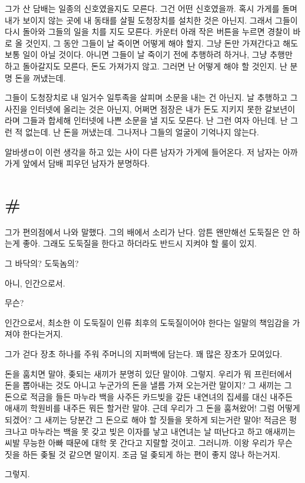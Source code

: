 \documentclass[a5paper,10pt, twoside, openright]{memoir}
\begin{document}
	그가 산 담배는 일종의 신호였을지도 모른다. 그건 어떤 신호였을까. 혹시 가게를 돌며 내가 보이지 않는 곳에 내 동태를 살필 도청장치를 설치한 것은 아닌지. 그래서 그들이 다시 돌아와 그들의 일을 치를 지도 모른다. 카운터 아래 작은 버튼을 누르면 경찰이 바로 올 것인지, 그 동안 그들이 날 죽이면 어떻게 해야 할지. 그냥 돈만 가져간다고 해도 보통 일이 아닐 것이다. 아니면 그들이 날 죽이기 전에 추행하려 하거나, 그냥 추행만 하고 돌아갈지도 모른다, 돈도 가져가지 않고. 그러면 난 어떻게 해야 할 것인지. 난 분명 돈을 꺼냈는데.

	그들이 도청장치로 내 일거수 일투족을 살피며 소문을 내는 건 아닌지. 날 추행하고 그 사진을 인터넷에 올리는 것은 아닌지, 어쩌면 점장은 내가 돈도 지키지 못한 갈보년이라며 그들과 합세해 인터넷에 나쁜 소문을 낼 지도 모른다. 난 그런 여자 아닌데. 난 그런 적 없는데. 난 돈을 꺼냈는데. 그나저나 그들의 얼굴이 기억나지 않는다. 

	알바생ㅁ이 이런 생각을 하고 있는 사이 다른 남자가 가게에 들어온다. 저 남자는 아까 가게 앞에서 담배 피우던 남자가 분명하다. 

	\section{\#}
	그가 편의점에서 나와 말했다. 그의 배에서 소리가 난다. 암튼 왠만해선 도둑질은 안 하는게 좋아. 그래도 도둑질을 한다고 하더라도 반드시 지켜야 할 룰이 있지.
	
	그 바닥의? 도둑놈의?
	
	아니, 인간으로서. 
	
	무슨? 
	
	인간으로서, 최소한 이 도둑질이 인류 최후의 도둑질이어야 한다는 일말의 책임감을 가져야 한다는거지. 

	그가 걷다 장초 하나를 주워 주머니의 지퍼백에 담는다. 꽤 많은 장초가 모여있다. 

	돈을 훔치면 말야, 좆되는 새끼가 분명히 있단 말이야. 그렇지. 우리가 뭐 프린터에서 돈을 뽑아내는 것도 아니고 누군가의 돈을 낼름 가져 오는거란 말이지? 그 새끼는 그 돈으로 적금을 들든 마누라 백을 사주든 카드빚을 갚든 내연녀의 집세를 대신 내주든 애새끼 학원비를 내주든 뭐든 할거란 말야. 근데 우리가 그 돈을 훔쳐왔어! 그럼 어떻게 되겠어? 그 새끼는 당분간 그 돈으로 해야 할 짓들을 못하게 되는거란 말야! 적금은 펑크나고 마누라는 백을 못 갖고 빚은 이자를 낳고 내연녀는 날 떠난다고 하고 애새끼는 씨발 무능한 아빠 때문에 대학 못 간다고 지랄할 것이고. 그러니까. 이왕 우리가 무슨 짓을 하든 좆될 것 같으면 말이지. 조금 덜 좆되게 하는 편이 좋지 않나 하는거지. 
	
	그렇지. 
	
\end{document}
